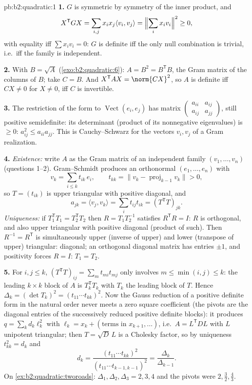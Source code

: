 \begin{solution}{pb:b2:quadratic:1}
\textbf{1.} $G$ is symmetric by symmetry of the inner product,
and
\[
X^{\mathsf T}GX = \sum_{i,j}x_ix_j\langle v_i, v_j\rangle
= \Bigl\|\sum_i x_iv_i\Bigr\|^2 \geq 0 ,
\]
with equality iff $\sum x_iv_i = 0$: $G$ is definite iff the
only null combination is trivial, i.e.\ iff the family is
independent.

\textbf{2.} With $B = \sqrt A$ (\cref{exo:b2:quadratic:6}): $A
= B^2 = B^{\mathsf T}B$, the Gram matrix of the columns of $B$;
take $C = B$. And $X^{\mathsf T}AX = \norm{CX}^2$, so $A$ is
definite iff $CX \neq 0$ for $X \neq 0$, iff $C$ is invertible.

\textbf{3.} The restriction of the form to
$\operatorname{Vect}(e_i, e_j)$ has matrix
$\begin{pmatrix} a_{ii} & a_{ij}\\ a_{ij} & a_{jj}
\end{pmatrix}$, still positive semidefinite: its determinant
(product of its nonnegative eigenvalues) is $\geq 0$:
$a_{ij}^2 \leq a_{ii}a_{jj}$. This is Cauchy--Schwarz for the
vectors $v_i, v_j$ of a Gram realization.

\textbf{4.} \emph{Existence:} write $A$ as the Gram matrix of
an independent family $(v_1, \dots, v_n)$ (questions 1--2).
Gram--Schmidt produces an orthonormal $(e_1, \dots, e_n)$ with
\[
v_k = \sum_{i \leq k} t_{ik}\,e_i,
\qquad t_{kk} = \bigl\| v_k - \operatorname{proj}_{k-1}v_k
\bigr\| > 0 ,
\]
so $T = (t_{ik})$ is upper triangular with positive diagonal,
and
\[
a_{jk} = \langle v_j, v_k\rangle
= \sum_i t_{ij}t_{ik} = (T^{\mathsf T}T)_{jk} .
\]
\emph{Uniqueness:} if $T_1^{\mathsf T}T_1 = T_2^{\mathsf T}T_2$
then $R = T_1T_2^{-1}$ satisfies $R^{\mathsf T}R = I$: $R$ is
orthogonal, and also upper triangular with positive diagonal
(product of such). Then $R^{-1} = R^{\mathsf T}$ is
simultaneously upper (inverse of upper) and lower (transpose of
upper) triangular: diagonal; an orthogonal diagonal matrix has
entries $\pm1$, and positivity forces $R = I$: $T_1 = T_2$.

\textbf{5.} For $i, j \leq k$, $(T^{\mathsf T}T)_{ij} = \sum_m
t_{mi}t_{mj}$ only involves $m \leq \min(i,j) \leq k$: the
leading $k\times k$ block of $A$ is $T_k^{\mathsf T}T_k$ with
$T_k$ the leading block of $T$. Hence $\Delta_k = (\det T_k)^2
= (t_{11}\cdots t_{kk})^2$. Now the Gauss reduction of a
positive definite form in the natural order never meets a zero
square coefficient (the pivots are the diagonal entries of the
successively reduced positive definite blocks): it produces $q
= \sum_k d_k\ell_k^2$ with $\ell_k = x_k + (\text{terms in }
x_{k+1}, \dots)$, i.e.\ $A = L^{\mathsf T}DL$ with $L$
unipotent triangular; then $T = \sqrt D\,L$ is a Cholesky
factor, so by uniqueness $t_{kk}^2 = d_k$ and
\[
d_k = \frac{(t_{11}\cdots t_{kk})^2}
{(t_{11}\cdots t_{k-1,k-1})^2}
= \frac{\Delta_k}{\Delta_{k-1}} .
\]
On \cref{ex:b2:quadratic:tworoads}: $\Delta_1, \Delta_2,
\Delta_3 = 2, 3, 4$ and the pivots were $2, \frac32, \frac43$.


\end{solution}
